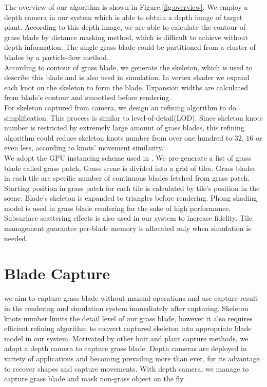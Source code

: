 \documentclass[10pt,journal,compsoc]{IEEEtran}
\begin{document}
The overview of our algorithm is shown in Figure.\ref{fig:overview}. We employ a depth camera in our system which is able to obtain a depth image of target plant. According to this depth image, we are able to calculate the contour of grass blade by distance masking method, which is difficult to achieve without depth information. The single grass blade could be partitioned from a cluster of blades by a particle-flow method\cite{neubert2007approximate}.\\

According to contour of grass blade, we generate the skeleton, which is used to describe this blade and is also used in simulation. In vertex shader we expand each knot on the skeleton to form the blade. Expansion widths are calculated from blade's contour and smoothed before rendering.\\

For skeleton captured from camera, we design an refining algorithm to do simplification. This process is similar to level-of-detail(LOD). Since skeleton knots number is restricted by extremely large amount of grass blades, this refining algorithm could reduce skeleton knots number from over one hundred to $32$, $16$ or even less, according to knots' movement similarity.\\

We adopt the GPU instancing scheme used in \cite{fan2015simulation}. We pre-generate a list of grass blade called grass patch. Grass scene is divided into a grid of tiles. Grass blades in each tile are specific number of continuous blades fetched from grass patch. Starting position in grass patch for each tile is calculated by tile's position in the scene. Blade's skeleton is expanded to triangles before rendering. Phong shading model is used in grass blade rendering for the sake of high performance. Subsurface scattering effects is also used in our system to increase fidelity\cite{sousa2007vegetation}. Tile management guarantee per-blade memory is allocated only when simulation is needed.  \\

\section{Blade Capture}\label{sec:capture}
we aim to capture grass blade without manual operations and use capture result in the rendering and simulation system immediately after capturing. Skeleton knots number limits the detail level of our grass blade, however it also requires efficient refining algorithm to convert captured skeleton into appropriate blade model in our system. Motivated by other hair and plant capture methods, we adopt a depth camera to capture grass blade. Depth cameras are deployed in variety of applications and becoming prevailing more than ever, for its advantage to recover shapes and capture movements. With depth camera, we manage to capture grass blade and mask non-grass object on the fly.\\
\end{document}
